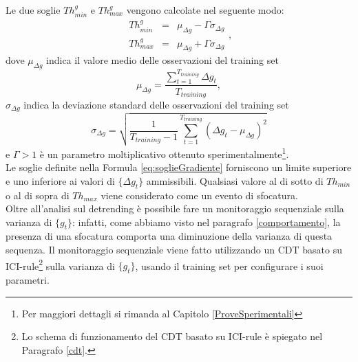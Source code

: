 Le due soglie $Th_{min}^g$ e $Th_{max}^g$ vengono calcolate nel seguente modo:
\begin{equation}
\label{eq:soglieGradiente}
\begin{array}{rcl}
Th_{min}^g & = & \mu_{\Delta g} -\Gamma \sigma_{\Delta g}\\
Th_{max}^g & = & \mu_{\Delta g} + \Gamma \sigma_{\Delta g}
\end{array},
\end{equation}
dove $\mu_{\Delta g}$ indica il valore medio delle osservazioni del training set
\begin{equation}
	\mu_{\Delta g}  = \frac{\sum_{t = 1}^{T_{training}} \Delta g_t}{T_{training}}, \nonumber
\end{equation}
$\sigma_{\Delta g}$ indica la deviazione standard delle osservazioni del training set
\begin{equation}
\sigma_{\Delta g}  = \sqrt{\frac{1}{T_{training}-1}\sum_{t=1}^{T_{training}}\left(\Delta g_t - \mu_{\Delta g}\right)^2} \nonumber
\end{equation}
e $\Gamma>1$ \`e un parametro moltiplicativo ottenuto sperimentalmente\footnote{Per maggiori dettagli si rimanda al Capitolo \ref{ProveSperimentali}}.\\
Le soglie definite nella Formula \eqref{eq:soglieGradiente} forniscono un limite superiore e uno inferiore ai valori di $\{\Delta g_t\}$ ammissibili.
Qualsiasi valore al di sotto di $Th_{min}$ o al di sopra di $Th_{max}$ viene considerato come un evento di sfocatura.\\ 
Oltre all'analisi sul detrending \`e possibile fare un monitoraggio sequenziale sulla varianza di $\{g_t\}$: infatti, come abbiamo visto nel paragrafo \ref{comportamento}, la presenza di una sfocatura comporta una diminuzione della varianza di questa sequenza.
Il monitoraggio sequenziale viene fatto utilizzando un CDT basato su ICI-rule\footnote{Lo schema di funzionamento del CDT basato su ICI-rule \`e spiegato nel Paragrafo \ref{cdt}.} sulla varianza di $\{g_t\}$, usando il training set per configurare i suoi parametri.


